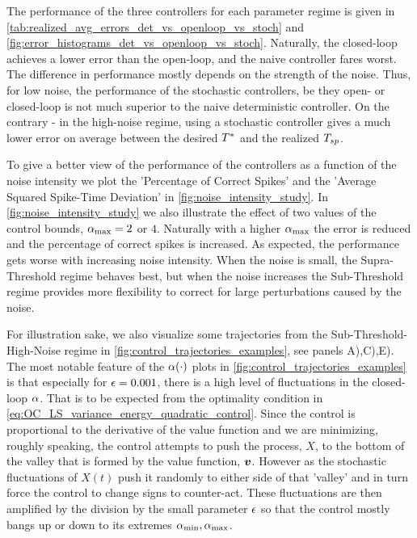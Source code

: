 The performance of the three controllers for each parameter regime is given in
\cref{tab:realized_avg_errors_det_vs_openloop_vs_stoch} and
\cref{fig:error_histograms_det_vs_openloop_vs_stoch}. Naturally, the closed-loop
achieves a lower error than the open-loop, and the naive controller fares worst.
The difference in performance mostly depends on the strength of the noise. Thus,
for low noise, the performance of the stochastic controllers, be they open- or
closed-loop is not much superior to the naive deterministic controller. On the
contrary - in the high-noise regime, using a stochastic controller gives a much
lower error on average between the desired ${ T^* }$ and the realized $T_{sp}$.

To give a better view of the performance of the controllers as a function of the
noise intensity we plot the 'Percentage of Correct Spikes' and the 'Average
Squared Spike-Time Deviation' in \cref{fig:noise_intensity_study}.
In \cref{fig:noise_intensity_study} we also illustrate the effect of two
values of the control bounds, ${ \alpha_{\textrm{max}} }=2$ or $4$. Naturally with a higher ${ \alpha_{\textrm{max}} }$
the error is reduced and the percentage of correct spikes is increased.
As expected, the performance gets worse with increasing noise intensity. When
the noise is small, the Supra-Threshold regime behaves best, but when the noise
increases the Sub-Threshold regime provides more flexibility to correct for
large perturbations caused by the noise. 

For illustration sake, we also visualize some trajectories from the
Sub-Threshold-High-Noise regime in \cref{fig:control_trajectories_examples}, see
panels A),C),E). The most notable feature of the $\alpha(\cdot)$ plots in
\cref{fig:control_trajectories_examples} is that especially for ${\epsilon}=0.001$,
there is a high level of fluctuations in the closed-loop $\alpha$. That is to be
expected from the optimality condition in
\cref{eq:OC_LS_variance_energy_quadratic_control}. Since the control is
proportional to the derivative of the value function and we are minimizing,
roughly speaking, the control attempts to push the process, $X$, to the bottom
of the valley that is formed by the value function, ${ \boldsymbol{v} }$. However as the
stochastic fluctuations of $X(t)$ push it randomly to either side of that
'valley' and in turn force the control to change signs to counter-act. These
fluctuations are then amplified by the division by the small parameter ${\epsilon}$ so
that the control mostly bangs up or down to its extremes ${ \alpha_{\textrm{min}} }, { \alpha_{\textrm{max}} }$.
 
